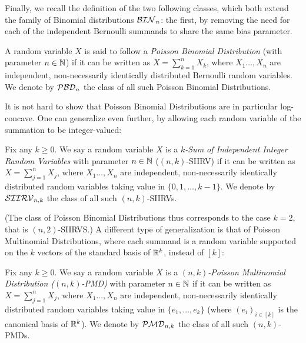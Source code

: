Finally, we recall the definition of the two following classes, which both extend the family of Binomial distributions $\classbin[n]$: the first, by removing the need for each of the independent Bernoulli summands to share the same bias parameter.
\begin{definition}\label{def:pbd}
A random variable $X$ is said to follow a \emph{Poisson Binomial Distribution} (with parameter $n\in\N$) if it can be written as $X=\sum_{k=1}^n X_k$, where $X_1\dots,X_n$ are independent, non-necessarily identically distributed Bernoulli random variables. We denote by $\classpbd[n]$ the class of all such Poisson Binomial Distributions.
\end{definition}
\noindent It is not hard to show that Poisson Binomial Distributions are in particular log-concave. One can generalize even further, by allowing each random variable of the summation to be integer-valued:
\begin{definition}\label{def:siirv}
Fix any $k\geq 0$. We say a random variable $X$ is a \emph{$k$-Sum of Independent Integer Random Variables} with parameter $n\in\N$ ($(n,k)$-SIIRV) if it can be written as $X=\sum_{j=1}^n X_j$, where $X_1\dots,X_n$ are independent, non-necessarily identically distributed random variables taking value in $\{0,1,\dots,k-1\}$. We denote by $\classksiirv[n]{k}$ the class of all such $(n,k)$-SIIRVs.
\end{definition}
\noindent (The class of Poisson Binomial Distributions thus corresponds to the case $k=2$, that is $(n,2)$-SIIRVS.) A different type of generalization is that of Poisson Multinomial Distributions, where each summand is a random variable supported on the $k$ vectors of the standard basis of $\R^k$, instead of $[k]$:
\begin{definition}\label{def:pmd}
Fix any $k\geq 0$. We say a random variable $X$ is a \emph{$(n,k)$-Poisson Multinomial Distribution ($(n,k)$-PMD)} with parameter $n\in\N$ if it can be written as $X=\sum_{j=1}^n X_j$, where $X_1\dots,X_n$ are independent, non-necessarily identically distributed random variables taking value in $\{e_1,\dots,e_k\}$ (where $(e_i)_{i\in[k]}$ is the canonical basis of $\R^k$). We denote by $\classpmd[n]{k}$ the class of all such $(n,k)$-PMDs.
\end{definition}
